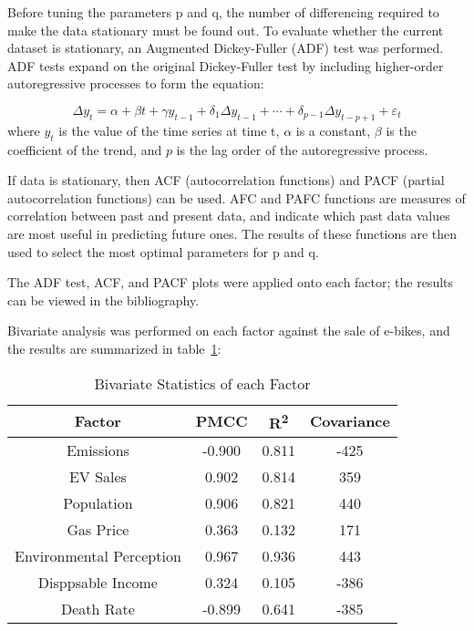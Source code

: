 Before tuning the parameters p and q, the number of differencing required to make the
data stationary must be found out. To evaluate whether the current dataset is stationary, an
Augmented Dickey-Fuller (ADF) test was performed.
ADF tests expand on the original Dickey-Fuller test by including higher-order autoregressive
processes to form the equation:


\begin{equation}
    \Delta y_{t}=\alpha +\beta t+\gamma y_{t-1}+\delta _{1}\Delta y_{t-1}+\cdots +\delta _{p-1}\Delta y_{t-p+1}+\varepsilon _{t}
\end{equation}
%
where
${y_{t}}$ is the value of the time series at time t,
${\alpha}$ is a constant,
${\beta}$ is the coefficient of the trend, and
$p$ is the lag order of the autoregressive process.

If data is stationary, then ACF (autocorrelation functions) and PACF (partial autocorrelation functions) can be used.
AFC and PAFC functions are measures of correlation between past
and present data, and indicate which past data values are most useful in predicting future
ones. The results of these functions are then used to select the most optimal parameters for
p and q.

The ADF test, ACF, and PACF plots were applied onto each factor; the results can be viewed in the bibliography.

Bivariate analysis was performed on each factor against the sale of e-bikes, and the results are summarized in table~\ref{tab:factor_bivar}:

\begin{table}[h!]
    \centering
    \caption{Bivariate Statistics of each Factor}
    \label{tab:factor_bivar}
    \begin{tabular}{cccc}
        \toprule
        Factor & PMCC & R\textsuperscript{2} & Covariance      \\
        \midrule
        Emissions   & -0.900 & 0.811 & -425    \\
        EV Sales & 0.902 & 0.814 & 359     \\
        Population & 0.906 & 0.821 & 440 \\
        Gas Price & 0.363 & 0.132 & 171 \\
        Environmental Perception & 0.967 & 0.936 & 443 \\
        Disppsable Income & 0.324 & 0.105 & -386 \\
        Death Rate & -0.899 & 0.641 & -385 \\
        \bottomrule
    \end{tabular}
\end{table}



